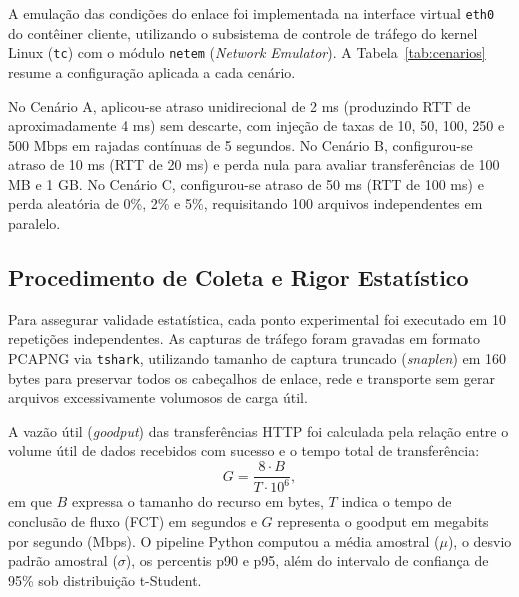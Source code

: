 \documentclass[12pt]{article}
\begin{document}
A emulação das condições do enlace foi implementada na interface virtual \texttt{eth0} do contêiner cliente, utilizando o subsistema de controle de tráfego do kernel Linux (\texttt{tc}) com o módulo \texttt{netem} (\emph{Network Emulator}). A Tabela~\ref{tab:cenarios} resume a configuração aplicada a cada cenário.

\begin{table}[htbp]
\centering
\caption{Parâmetros de emulação e cargas de trabalho por cenário experimental.}
\label{tab:cenarios}
\small
{}
\end{table}

No Cenário A, aplicou-se atraso unidirecional de 2 ms (produzindo RTT de aproximadamente 4 ms) sem descarte, com injeção de taxas de 10, 50, 100, 250 e 500 Mbps em rajadas contínuas de 5 segundos. No Cenário B, configurou-se atraso de 10 ms (RTT de 20 ms) e perda nula para avaliar transferências de 100 MB e 1 GB. No Cenário C, configurou-se atraso de 50 ms (RTT de 100 ms) e perda aleatória de 0\%, 2\% e 5\%, requisitando 100 arquivos independentes em paralelo.

\subsection{Procedimento de Coleta e Rigor Estatístico}

Para assegurar validade estatística, cada ponto experimental foi executado em 10 repetições independentes. As capturas de tráfego foram gravadas em formato PCAPNG via \texttt{tshark}, utilizando tamanho de captura truncado (\emph{snaplen}) em 160 bytes para preservar todos os cabeçalhos de enlace, rede e transporte sem gerar arquivos excessivamente volumosos de carga útil.

A vazão útil (\emph{goodput}) das transferências HTTP foi calculada pela relação entre o volume útil de dados recebidos com sucesso e o tempo total de transferência:
\begin{equation}
G = \frac{8 \cdot B}{T \cdot 10^6},
\end{equation}
em que $B$ expressa o tamanho do recurso em bytes, $T$ indica o tempo de conclusão de fluxo (FCT) em segundos e $G$ representa o goodput em megabits por segundo (Mbps). O pipeline Python computou a média amostral ($\mu$), o desvio padrão amostral ($\sigma$), os percentis p90 e p95, além do intervalo de confiança de 95\% sob distribuição t-Student.
\end{document}
